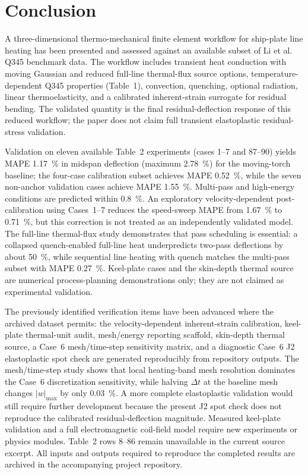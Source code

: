 \section{Conclusion}
\label{sec:conclusion}

A three-dimensional thermo-mechanical finite element workflow for ship-plate line heating has been presented and assessed against an available subset of Li et al.\ \cite{li2023} Q345 benchmark data. The workflow includes transient heat conduction with moving Gaussian and reduced full-line thermal-flux source options, temperature-dependent Q345 properties (Table~1), convection, quenching, optional radiation, linear thermoelasticity, and a calibrated inherent-strain surrogate for residual bending. The validated quantity is the final residual-deflection response of this reduced workflow; the paper does not claim full transient elastoplastic residual-stress validation.

Validation on eleven available Table~2 experiments (cases 1--7 and 87--90) yields MAPE \SI{1.17}{\%} in midspan deflection (maximum \SI{2.78}{\%}) for the moving-torch baseline; the four-case calibration subset achieves MAPE \SI{0.52}{\%}, while the seven non-anchor validation cases achieve MAPE \SI{1.55}{\%}. Multi-pass and high-energy conditions are predicted within \SI{0.8}{\%}. An exploratory velocity-dependent post-calibration using Cases~1--7 reduces the speed-sweep MAPE from \SI{1.67}{\%} to \SI{0.71}{\%}, but this correction is not treated as an independently validated model. The full-line thermal-flux study demonstrates that pass scheduling is essential: a collapsed quench-enabled full-line heat underpredicts two-pass deflections by about \SI{50}{\%}, while sequential line heating with quench matches the multi-pass subset with MAPE \SI{0.27}{\%}. Keel-plate cases and the skin-depth thermal source are numerical process-planning demonstrations only; they are not claimed as experimental validation.

The previously identified verification items have been advanced where the archived dataset permits: the velocity-dependent inherent-strain calibration, keel-plate thermal-unit audit, mesh/energy reporting scaffold, skin-depth thermal source, a Case~6 mesh/time-step sensitivity matrix, and a diagnostic Case~6 J2 elastoplastic spot check are generated reproducibly from repository outputs. The mesh/time-step study shows that local heating-band mesh resolution dominates the Case~6 discretization sensitivity, while halving $\Delta t$ at the baseline mesh changes $|w|_{\max}$ by only \SI{0.03}{\%}. A more complete elastoplastic validation would still require further development because the present J2 spot check does not reproduce the calibrated residual-deflection magnitude. Measured keel-plate validation and a full electromagnetic coil-field model require new experiments or physics modules. Table~2 rows 8--86 remain unavailable in the current source excerpt. All inputs and outputs required to reproduce the completed results are archived in the accompanying project repository.
